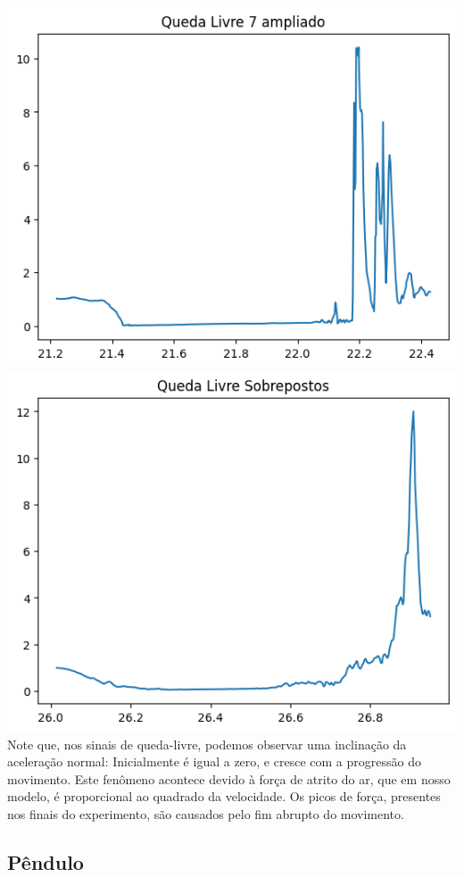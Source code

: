\documentclass{article}
\begin{document}
\includegraphics{Q7.png}\\
\includegraphics{Q-sobreposto.png}\\

Note que, nos sinais de queda-livre, podemos observar uma inclinação da aceleração normal: Inicialmente é igual a zero, e cresce com a progressão do movimento. Este fenômeno acontece devido à força de atrito do ar, que em nosso modelo, é proporcional ao quadrado da velocidade. Os picos de força, presentes nos finais do experimento, são causados pelo fim abrupto do movimento.

\subsection{Pêndulo}
\end{document}
